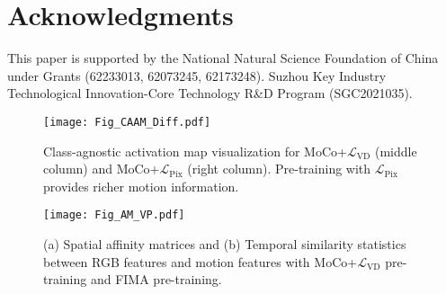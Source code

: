 \documentclass[sigconf,screen]{acmart}
\begin{document}
\section{Acknowledgments}
This paper is supported by the National Natural Science Foundation of China under Grants (62233013, 62073245, 62173248). Suzhou Key Industry Technological Innovation-Core Technology R\&D Program (SGC2021035).



\begin{figure}[tbp]
\begin{center}
\texttt{[image: Fig\_CAAM\_Diff.pdf]}
\end{center}
\caption{Class-agnostic activation map visualization for MoCo+$\mathcal{L}_{\mathrm{VD}}$ (middle column) and MoCo+$\mathcal{L}_{\mathrm{Pix}}$ (right column). Pre-training with $\mathcal{L}_{\mathrm{Pix}}$ provides richer motion information.
}
\label{CAAM_Diff}
\end{figure}
\begin{figure}[tbp]
\begin{center}
\texttt{[image: Fig\_AM\_VP.pdf]}
\end{center}
\caption{(a) Spatial affinity matrices and (b) Temporal similarity statistics between RGB features and motion features with MoCo+$\mathcal{L}_{\mathrm{VD}}$ pre-training and FIMA pre-training.
}
\label{AM_VP}
\end{figure}

\balance

\end{document}
